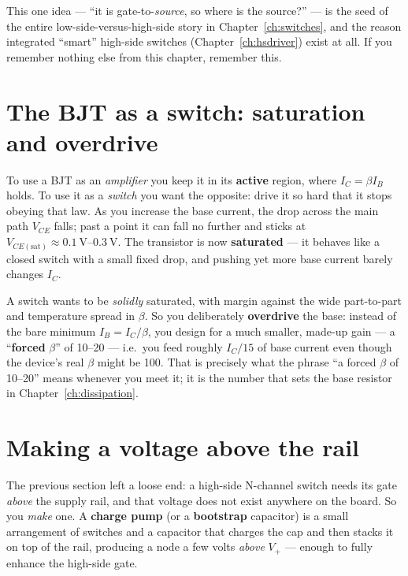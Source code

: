 \documentclass[11pt,a4paper,oneside]{book}
\begin{document}
\begin{note}
This one idea --- ``it is gate-to-\emph{source}, so where is the source?'' --- is the seed
of the entire low-side-versus-high-side story in Chapter~\ref{ch:switches}, and the reason
integrated ``smart'' high-side switches (Chapter~\ref{ch:hsdriver}) exist at all. If you
remember nothing else from this chapter, remember this.
\end{note}

\section{The BJT as a switch: saturation and overdrive}
To use a BJT as an \emph{amplifier} you keep it in its \textbf{active} region, where
$I_C=\beta I_B$ holds. To use it as a \emph{switch} you want the opposite: drive it so hard
that it stops obeying that law. As you increase the base current, the drop across the main
path $V_{CE}$ falls; past a point it can fall no further and sticks at
$V_{CE(\text{sat})}\approx\qtyrange{0.1}{0.3}{\volt}$. The transistor is now
\textbf{saturated} --- it behaves like a closed switch with a small fixed drop, and pushing
yet more base current barely changes $I_C$.

A switch wants to be \emph{solidly} saturated, with margin against the wide part-to-part
and temperature spread in $\beta$. So you deliberately \textbf{overdrive} the base: instead
of the bare minimum $I_B=I_C/\beta$, you design for a much smaller, made-up gain --- a
``\textbf{forced} $\beta$'' of \numrange{10}{20} --- i.e.\ you feed roughly $I_C/15$ of base
current even though the device's real $\beta$ might be 100. That is precisely what the
phrase ``a forced $\beta$ of 10--20'' means whenever you meet it; it is the number that
sets the base resistor in Chapter~\ref{ch:dissipation}.

\section{Making a voltage above the rail}
The previous section left a loose end: a high-side N-channel switch needs its gate
\emph{above} the supply rail, and that voltage does not exist anywhere on the board. So you
\emph{make} one. A \textbf{charge pump} (or a \textbf{bootstrap} capacitor) is a small
arrangement of switches and a capacitor that charges the cap and then stacks it on top of
the rail, producing a node a few volts \emph{above} $V_+$ --- enough to fully enhance the
high-side gate.
\end{document}
